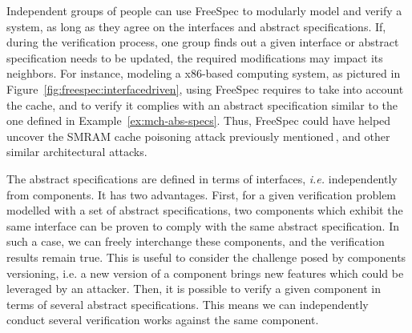Independent groups of people can use FreeSpec to modularly model and verify a
system, as long as they agree on the interfaces and abstract specifications.
%
If, during the verification process, one group finds out a given interface or
abstract specification needs to be updated, the required modifications may
impact its neighbors.
%
For instance, modeling a x86-based computing system, as pictured in
Figure~\ref{fig:freespec:interfacedriven}, using FreeSpec requires to take into
account the cache, and to verify it complies with an abstract specification
similar to the one defined in Example~\ref{ex:mch-abs-specs}.
%
Thus, FreeSpec could have helped uncover the SMRAM cache poisoning attack
previously mentioned\,\cite{wojtczuk2009smram,duflot2009smram}, and other
similar architectural attacks.

The abstract specifications are defined in terms of interfaces, \emph{i.e.}
independently from components.
%
It has two advantages.
%
First, for a given verification problem modelled with a set of abstract
specifications, two components which exhibit the same interface can be proven to
comply with the same abstract specification.
%
In such a case, we can freely interchange these components, and the verification
results remain true.
%
This is useful to consider the challenge posed by components versioning, i.e. a
new version of a component brings new features which could be leveraged by an
attacker.
%
Then, it is possible to verify a given component in terms of several abstract
specifications.
%
This means we can independently conduct several verification works against the
same component.
